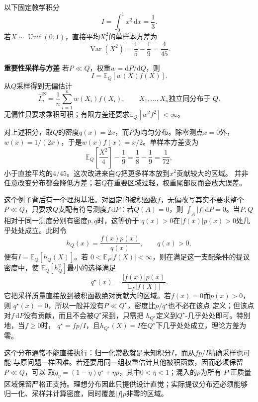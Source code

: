 以下固定教学积分
\[ I=\int_0^1x^2\,\mathrm{d}x=\frac13. \]
若\(X\sim\operatorname{Unif}(0,1)\)，直接平均\(X_i^2\)的单样本方差为
\[ \operatorname{Var}(X^2)
  =\frac15-\frac19=\frac{4}{45}. \]

\par\medskip\noindent\textbf{重要性采样与方差}\quad
若\(P\ll Q\)，权重\(w=\mathrm{d}P/\mathrm{d}Q\)，则
\[ I=\mathbb{E}_Q[w(X)f(X)]. \]
从\(Q\)采样得到无偏估计
\begin{equation}
  \widehat{I}^{\mathrm{IS}}_n
  =
  \frac{1}{n}\sum_{i=1}^{n}w(X_i)f(X_i),
  \qquad X_1,\ldots,X_n\text{独立同分布于 }Q.
  \label{eq:probability-importance-sampling}
\end{equation}
无偏性只要求乘积可积；有限方差还要求\(\mathbb{E}_Q[w^2f^2]<\infty\)。

对上述积分，取\(Q\)的密度\(q(x)=2x\)，而\(P\)为均匀分布。除零测点\(x=0\)外，\(w(x)=1/(2x)\)，于是\(w(x)f(x)=x/2\)。单样本方差变为
\[ \mathbb{E}_Q\left[\frac{X^2}{4}\right]-\frac19
  =\frac18-\frac19=\frac{1}{72}, \]
小于直接平均的\(4/45\)。这次改进来自\(Q\)把更多样本放到\(x^2\)贡献较大的区域。
并非任意改变分布都会降低方差；若\(Q\)在重要区域过轻，权重尾部反而会放大误差。

这个例子背后有一个理想基准。对固定的被积函数\(f\)，无偏改写其实不要求整个
\(P\ll Q\)，只要求\(Q\)支配有符号测度\(f\,\mathrm{d}P\)：若\(Q(A)=0\)，则
\(\int_A|f|\,\mathrm{d}P=0\)。当\(P,Q\)相对于同一测度分别有密度\(p,q\)时，这等价于
\(q(x)>0\)在\(|f(x)|p(x)>0\)处几乎处处成立。此时令
\[
  h_Q(x)=\frac{f(x)p(x)}{q(x)},\qquad q(x)>0,
\]
便有\(I=\mathbb{E}_Q[h_Q(X)]\)。若
\(0<\mathbb{E}_P|f(X)|<\infty\)，则在满足这一支配条件的提议密度中，使
\(\mathbb{E}_Q[h_Q^2]\)最小的选择满足
\[
  q^\star(x)
  =
  \frac{|f(x)|p(x)}{\mathbb{E}_P|f(X)|}.
\]
它把采样质量直接放到被积函数绝对贡献大的区域。若\(f(x)=0\)而\(p(x)>0\)，则
\(q^\star(x)=0\)，所以一般并没有\(P\ll Q^\star\)，密度比\(p/q^\star\)也不必在该点
定义；但该点对\(f\,\mathrm{d}P\)没有贡献，而且不会被\(Q^\star\)采到，只需把
\(h_{Q^\star}\)定义到\(Q^\star\)-几乎处处即可。特别地，当\(f\geq0\)时，
\(q^\star=fp/I\)，且\(h_{Q^\star}(X)=I\)在\(Q^\star\)下几乎处处成立，理论方差为零。

这个分布通常不能直接执行：归一化常数就是未知积分\(I\)，而从\(fp/I\)精确采样也可能
与原问题一样困难。若还要用同一组权重估计其他被积函数，因而必须保留\(P\ll Q\)，可以
取\(q_\eta=(1-\eta)q^\star+\eta p\)，其中\(0<\eta<1\)；混入的\(p\)为所有
\(P\)-正质量区域保留严格正支持。理想分布因此只提供设计直觉；实际提议分布还必须能够
归一化、采样并计算密度，同时覆盖\(|f|p\)非零的区域。

